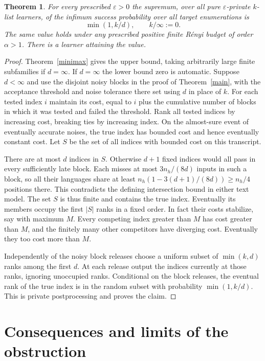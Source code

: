 \documentclass[11pt]{article}
\newtheorem{theorem}{Theorem}
\begin{document}
\begin{theorem}\label{value}
For every prescribed $\varepsilon>0$ the supremum, over all pure $\varepsilon$-private $k$-list learners, of the infimum success probability over all target enumerations is
\[
 \min(1,k/d), \qquad k/\infty:=0 .
\]
The same value holds under any prescribed positive finite R\'enyi budget of order $\alpha>1$. There is a learner attaining the value.
\end{theorem}
\begin{proof}
Theorem~\ref{minimax} gives the upper bound, taking arbitrarily large finite subfamilies if $d=\infty$. If $d=\infty$ the lower bound zero is automatic. Suppose $d<\infty$ and use the disjoint noisy blocks in the proof of Theorem~\ref{main}, with the acceptance threshold and noise tolerance there set using $d$ in place of $k$. For each tested index $i$ maintain its cost, equal to $i$ plus the cumulative number of blocks in which it was tested and failed the threshold. Rank all tested indices by increasing cost, breaking ties by increasing index. On the almost-sure event of eventually accurate noises, the true index has bounded cost and hence eventually constant cost. Let $S$ be the set of all indices with bounded cost on this transcript.

There are at most $d$ indices in $S$. Otherwise $d+1$ fixed indices would all pass in every sufficiently late block. Each misses at most $3n_h/(8d)$ inputs in such a block, so all their languages share at least $n_h(1-3(d+1)/(8d))\ge n_h/4$ positions there. This contradicts the defining intersection bound in either text model. The set $S$ is thus finite and contains the true index. Eventually its members occupy the first $|S|$ ranks in a fixed order. In fact their costs stabilize, say with maximum $M$. Every competing index greater than $M$ has cost greater than $M$, and the finitely many other competitors have diverging cost. Eventually they too cost more than $M$.

Independently of the noisy block releases choose a uniform subset of $\min(k,d)$ ranks among the first $d$. At each release output the indices currently at those ranks, ignoring unoccupied ranks. Conditional on the block releases, the eventual rank of the true index is in the random subset with probability $\min(1,k/d)$. This is private postprocessing and proves the claim.
\end{proof}

\section{Consequences and limits of the obstruction}
\end{document}
